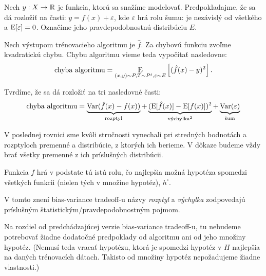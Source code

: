 \begin{theorem}
  Nech $y : X \to \mathbb{R}$ je funkcia, ktorú sa snažíme modelovať.
  Predpokladajme, že sa dá rozložiť na časti: $y = f(x) + \varepsilon$,
  kde $\varepsilon$ hrá rolu šumu: je nezávislý od všetkého a
  $\operatorname*{\mathrm{E}}[\varepsilon] = 0$. Označíme jeho pravdepodobnostnú distribúciu
  $E$.
  
  Nech výstupom trénovacieho algoritmu je $\hat{f}$. Za chybovú
  funkciu zvoľme kvadratickú chybu. Chybu algoritmu vieme teda
  vypočítať nasledovne:
  $$\text{\normalfont chyba algoritmu} = \operatorname*{\mathrm{E}}_{(x, y) \sim P, T \sim P^t, \varepsilon \sim E} \left[ (\hat{f}(x) - y)^2 \right].$$
  
  Tvrdíme, že sa dá rozložiť na tri nasledovné časti:
  $$
  \text{\normalfont chyba algoritmu}
      = \underbrace{\operatorname*{\mathrm{Var}}(\hat{f}(x) - f(x))}_{\text{\normalfont rozptyl}}
      + \underbrace{(\operatorname*{\mathrm{E}}[\hat{f}(x)] - \operatorname*{\mathrm{E}}[f(x)])^2}_{\text{\normalfont výchylka}^2}
      + \underbrace{\operatorname*{\mathrm{Var}}(\varepsilon)}_{\text{\normalfont šum}}
  $$
\end{theorem}
\begin{remark}
  V poslednej rovnici sme kvôli stručnosti vynechali pri stredných
  hodnotách a rozptyloch premenné a distribúcie, z ktorých ich berieme.
  V dôkaze budeme vždy brať všetky premenné z ich príslušných distribúcii.
\end{remark}
\begin{remark}
  Funkcia $f$ hrá v podstate tú istú rolu, čo najlepšia možná hypotéza
  spomedzi všetkých funkcii (nielen tých v množine hypotéz), $h^\square$.
\end{remark}
\begin{remark}
  V tomto znení bias-variance tradeoff-u názvy \emph{rozptyl} a
  \emph{výchylka} zodpovedajú príslušným štatistickým/pravdepodobnostným
  pojmom.
\end{remark}
\begin{remark}
  Na rozdiel od predchádzajúcej verzie bias-variance tradeoff-u, tu
  nebudeme potrebovať žiadne dodatočné predpoklady od algoritmu ani
  od jeho množiny hypotéz. (Nemusí teda vracať hypotézu, ktorá je
  spomedzi hypotéz v $H$ najlepšia na daných trénovacích dátach.
  Takisto od množiny hypotéz nepožadujeme žiadne vlastnosti.)
\end{remark}
